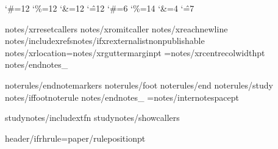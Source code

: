 \catcode`\#=12 \catcode`\%=12 \catcode`\&=12 \catcode`\^=12
\catcode`\#=6 \catcode`\%=14 \catcode`\&=4 \catcode`\^=7
%

{notes/xrresetcallers}
{notes/xromitcaller}
{notes/xreachnewline}
{notes/includexrefs}{notes/ifxrexternalist}\expandafter\def\csname x:properties\endcsname{{nonpublishable}}
{notes/xrlocation}\def\XrefNotes{{x}}\XrefNotesMargin={notes/xrguttermargin}pt \XrefNotesWidth={notes/xrcentrecolwidth}pt\def\XrefSide{{{notes/xrcolside}}}
{notes/endnotes_}

{noterules/endnotemarkers}
{noterules/foot}
{noterules/end}
{noterules/study}
{notes/iffootnoterule}\def\FootNoteRuleThickness{{0pt}}
{notes/endnotes_}\def\EndNoteRuleThickness{{0pt}}
\InterNoteSpace={notes/internotespace}pt

{studynotes/includextfn}
{studynotes/showcallers}

\def\HeaderPosition{{{paper/headerposition}}}
\def\FooterPosition{{{paper/footerposition}}}
{header/ifrhrule}\RHruleposition={paper/ruleposition}pt
\def\RangeSeparator{{\kern.1em\char"2013\kern.1em}} %
\def\ChapterVerseSeparator{{\kern.02em{header/chvseparator}\kern.02em}} %

\def\RHevenleft{{{header/evenleft}}}
\def\RHevencenter{{{header/evencenter}}}
\def\RHevenright{{{header/evenright}}}

\def\RHoddleft{{{header/oddleft}}}
\def\RHoddcenter{{{header/oddcenter}}}
\def\RHoddright{{{header/oddright}}}

\def\RHnoVevenleft{{{header/noVevenleft}}}
\def\RHnoVevencenter{{{header/noVevencenter}}}
\def\RHnoVevenright{{{header/noVevenright}}}

